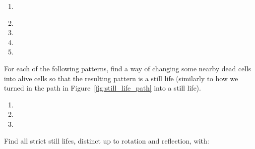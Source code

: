 \begin{multicols}{2}
\begin{problemstar}
\begin{multicols}{2}
\begin{enumerate}[label=(\alph*),series=exer_pseudo]
				\item[\bf\color{ocre}(c)] \\[1.0em]
				
				\item[\bf\color{ocre}(e)] 
				
				\item[\bf\color{ocre}(b)] 
				
				\item[\bf\color{ocre}(d)] 
				
				\item[\bf\color{ocre}(f)] 
			\end{enumerate}
		\end{multicols}
	\end{problemstar}
	
	
	\mfilbreak
	
	
	\begin{problemstar}\label{exer:still_life_add_dead} 
		For each of the following patterns, find a way of changing some nearby dead cells into alive cells so that the resulting pattern is a still life (similarly to how we turned in the path in Figure~\ref{fig:still_life_path} into a still life).\vspace*{-0.25cm}
		
		\begin{multicols}{2}
			\begin{enumerate}
				\item[\bf\color{ocre}(a)] 
				
				\item[\bf\color{ocre}(c)] 
				
				\item[\bf\color{ocre}(b)] 
			\end{enumerate}
		\end{multicols}
	\end{problemstar}
	
	
	\mfilbreak
	
	
	\begin{problem}\label{exer:small_strict_still_lifes} 
		Find all strict still lifes, distinct up to rotation and reflection, with:\smallskip
		

\end{problem}
\end{multicols}
